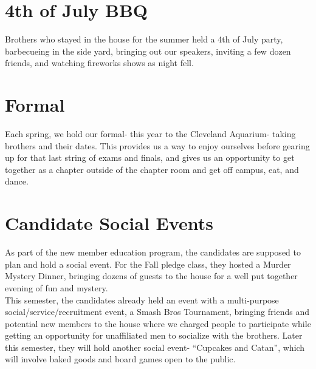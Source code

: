   \section*{4th of July BBQ}
    Brothers who stayed in the house for the summer held a 4th of July party, barbecueing in the side yard, bringing out our speakers, inviting a few dozen friends, and watching fireworks shows as night fell.
  
  \section*{Formal}
    Each spring, we hold our formal- this year to the Cleveland Aquarium- taking brothers and their dates. This provides us a way to enjoy ourselves before gearing up for that last string of exams and finals, and gives us an opportunity to get together as a chapter outside of the chapter room and get off campus, eat, and dance.
      
  \section*{Candidate Social Events}
    As part of the new member education program, the candidates are supposed to plan and hold a social event. For the Fall pledge class, they hosted a Murder Mystery Dinner, bringing dozens of guests to the house for a well put together evening of fun and mystery. \\
    
    This semester, the candidates already held an event with a multi-purpose social/service/recruitment event, a Smash Bros Tournament, bringing friends and potential new members to the house where we charged people to participate while getting an opportunity for unaffiliated men to socialize with the brothers. Later this semester, they will hold another social event- ``Cupcakes and Catan'', which will involve baked goods and board games open to the public.